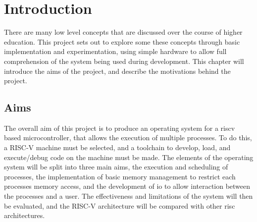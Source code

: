\chapter{Introduction}
\label{cha:intro}
There are many low level concepts that are discussed over the course of higher education. This project sets out to explore some these concepts through basic implementation and experimentation, using simple hardware to allow full comprehension of the system being used during development. This chapter will introduce the aims of the project, and describe the motivations behind the project.
\section{Aims}
The overall aim of this project is to produce an operating system for a \gls{riscv} based microcontroller, that allows the execution of multiple processes. To do this, a RISC-V machine must be selected, and a toolchain to develop, load, and execute/debug code on the machine must be made. The elements of the operating system will be split into three main aims, the execution and scheduling of processes, the implementation of basic memory management to restrict each processes memory access, and the development of \ac{io} to allow interaction between the processes and a user. The effectiveness and limitations of the system will then be evaluated, and the RISC-V architecture will be compared with other \ac{risc} architectures.

